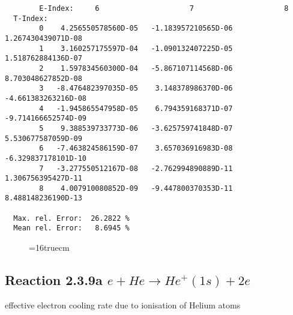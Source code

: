 \documentclass[12pt]{article}
\begin{document}
\begin{small}
\begin{verbatim}
        E-Index:     6                     7                     8
  T-Index:
        0    4.256550578560D-05   -1.183957210565D-06    1.267430439071D-08
        1    3.160257175597D-04   -1.090132407225D-05    1.518762884136D-07
        2    1.597834560300D-04   -5.867107114568D-06    8.703048627852D-08
        3   -8.476482397035D-05    3.148378986370D-06   -4.661383263216D-08
        4   -1.945865547958D-05    6.794359168371D-07   -9.714166652574D-09
        5    9.388539733773D-06   -3.625759741848D-07    5.530677587059D-09
        6   -7.463824586159D-07    3.657036916983D-08   -6.329837178101D-10
        7   -3.277550512167D-08   -2.762994890889D-11    1.306756395427D-11
        8    4.007910080852D-09   -9.447800370353D-11    8.488148236190D-13

  Max. rel. Error:  26.2822 %
  Mean rel. Error:   8.6945 %

\end{verbatim}\end{small}
\begin{figure} \label{2.1.8ro}
\epsfxsize=16truecm
\end{figure}
\newpage

\subsection{
Reaction 2.3.9a $e + He \rightarrow He^+(1s) + 2e$
}

   effective electron cooling rate due to ionisation of Helium atoms
\end{document}

